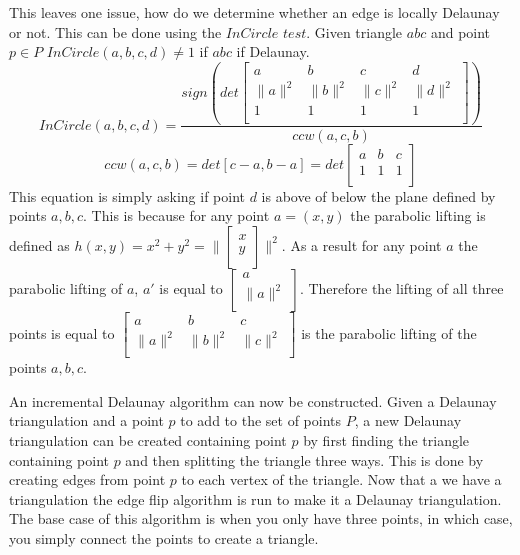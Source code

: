\documentclass[11pt]{article}
\begin{document}
This leaves one issue, how do we determine whether an edge is locally Delaunay or not. This can be done using the $InCircle$ $test$. Given triangle $abc$ and point $p \in P$ $InCircle(a,b,c,d) \neq 1$ if $abc$ if Delaunay. 
	\begin{equation}
		InCircle(a,b,c,d) = \frac{sign(det
		\begin{bmatrix}
    			a & b & c & d \\
    			\|a\|^2 & \|b\|^2 & \|c\|^2 & \|d\|^2 \\
    			1 & 1 & 1 & 1 \\
		\end{bmatrix} 
		)}{ccw(a,c,b)}
	\end{equation}
	\begin{equation}
		ccw(a,c,b) = det[c-a,b-a] = det
		\begin{bmatrix}
    			a & b & c \\
    			1 & 1 & 1\\
		\end{bmatrix} 
	\end{equation}
This equation is simply asking if point $d$ is above of below the plane defined by points $a,b,c$. This is because for any point $a = (x,y)$ the parabolic lifting is defined as $h(x,y) = x^2 + y^2 = \| 
	\begin{bmatrix} 
		x \\
		y \\ 
	\end{bmatrix} 
	\|^2$.
	As a result for any point $a$ the parabolic lifting of $a$, $a'$ is equal to $
	\begin{bmatrix} 
		a \\ 
		\| a \|^2 \\ 
	\end{bmatrix}$. 
	Therefore the lifting of all three points is equal to
	$\begin{bmatrix}
    			a & b & c \\
    			\|a\|^2 & \|b\|^2 & \|c\|^2 \\
	\end{bmatrix}$ 
	is the parabolic lifting of the points $a,b,c$.

An incremental Delaunay algorithm can now be constructed. Given a Delaunay triangulation and a point $p$ to add to the set of points $P$, a new Delaunay triangulation can be created containing point $p$ by first finding the triangle containing point $p$ and then splitting the triangle three ways. This is done by creating edges from point $p$ to each vertex of the triangle. Now that a we have a triangulation the edge flip algorithm is run to make it a Delaunay triangulation. The base case of this algorithm is when you only have three points, in which case, you simply connect the points to create a triangle. 
\end{document}
